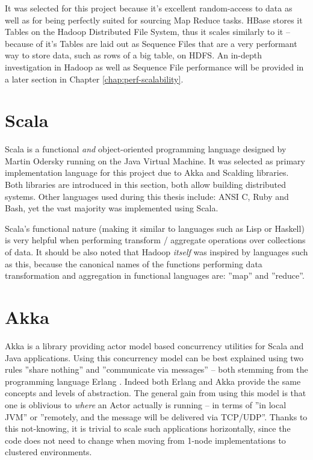 It was selected for this project because it's excellent random-access to data as well as for being perfectly suited for sourcing Map Reduce tasks. HBase stores it Tables on the Hadoop Distributed File System, thus it scales similarly to it -- because of it's Tables are laid out as Sequence Files that are a very performant way to store data, such as rows of a big table, on HDFS. An in-depth investigation in Hadoop as well as Sequence File performance will be provided in a later section in Chapter \ref{chap:perf-scalability}.

\section{Scala}
\label{sec:scala}
Scala is a functional \textit{and} object-oriented programming language designed by Martin Odersky \cite{scala} running on the Java Virtual Machine. It was selected as primary implementation language for this project due to Akka and Scalding libraries. Both libraries are introduced in this section, both allow building distributed systems. Other languages used during this thesis include: ANSI C, Ruby and Bash, yet the vast majority was implemented using Scala.

Scala's functional nature (making it similar to languages such as Lisp or Haskell) is very helpful when performing transform / aggregate operations over collections of data. It should be also noted that Hadoop \textit{itself} was inspired by languages such as this, because the canonical names of the functions performing data transformation and aggregation in functional languages are: ''map'' and ''reduce''.

\section{Akka}
\label{sec:akka}

Akka \cite{akka-docs} is a library providing actor model \cite{actor-model} based concurrency utilities for Scala and Java applications. 
Using this concurrency model can be best explained using two rules ''share nothing'' and ''communicate via messages'' -- both stemming from the programming language Erlang \cite{erlang}. Indeed both Erlang and Akka provide the same concepts and levels of abstraction. The general gain from using this model is that one is oblivious to \textit{where} an Actor  actually is running -- in terms of ''in local JVM'' or ''remotely, and the message will be delivered via TCP/UDP''. Thanks to this not-knowing, it is trivial to scale such applications horizontally, since the code does not need to change when moving from 1-node implementations to clustered environments.

